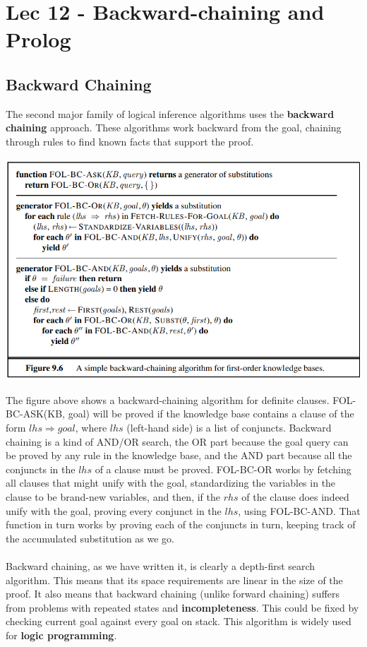 \chapter{Lec 12 - Backward-chaining and Prolog}
\section{Backward Chaining}
The second major family of logical inference algorithms uses the \textbf{backward chaining} approach. These algorithms work backward from
the goal, chaining through rules to find known facts that support the proof.
\begin{center}
    \includegraphics[]{images/backward-fol.png}
\end{center}
The figure above shows a backward-chaining algorithm for definite clauses. FOL-BC-ASK(KB,
goal) will be proved if the knowledge base contains a clause of the form $lhs \Rightarrow goal$, where $lhs$ (left-hand side) is a list of conjuncts. Backward chaining is a kind of AND/OR search, the OR part because the goal query can be proved by any rule in the knowledge base, and the AND part because all the conjuncts in the $lhs$ of a clause must be proved.  FOL-BC-OR works by fetching all clauses that might unify with the goal, standardizing the variables in the clause to be brand-new variables, and
then, if the $rhs$ of the clause does indeed unify with the goal, proving every conjunct in the $lhs$, using FOL-BC-AND. That function in turn works by proving each of the conjuncts in turn, keeping track of the accumulated substitution as we go.\\\\
Backward chaining, as we have written it, is clearly a depth-first search algorithm. This means that its space requirements are linear in the size of the proof. It also means that backward chaining (unlike forward chaining) suffers from problems with repeated states and \textbf{incompleteness}. This could be fixed by checking current goal against every goal on stack. This algorithm is widely used for \textbf{logic programming}.
